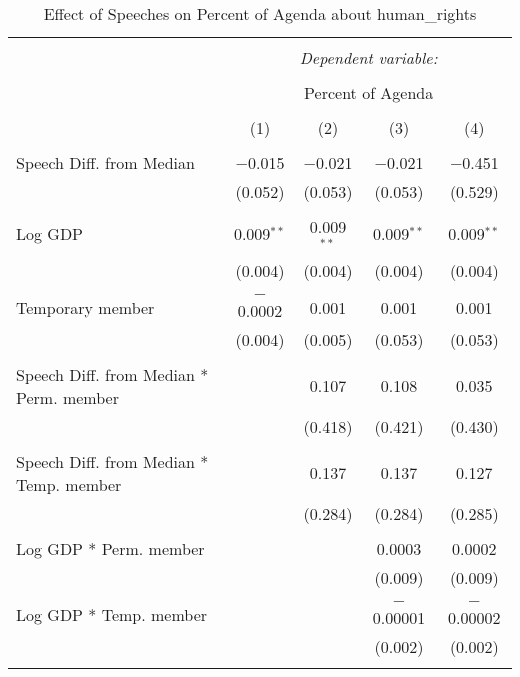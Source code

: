 
\begin{table}[!htbp] \centering 
  \caption{Effect of Speeches on Percent of Agenda about human_rights} 
  \label{} 
\begin{tabular}{@{\extracolsep{5pt}}lcccc} 
\\[-1.8ex]\hline 
\hline \\[-1.8ex] 
 & \multicolumn{4}{c}{\textit{Dependent variable:}} \\ 
\cline{2-5} 
\\[-1.8ex] & \multicolumn{4}{c}{Percent of Agenda} \\ 
\\[-1.8ex] & (1) & (2) & (3) & (4)\\ 
\hline \\[-1.8ex] 
 Speech Diff. from Median & $-$0.015 & $-$0.021 & $-$0.021 & $-$0.451 \\ 
  & (0.052) & (0.053) & (0.053) & (0.529) \\ 
  & & & & \\ 
 Log GDP & 0.009$^{**}$ & 0.009$^{**}$ & 0.009$^{**}$ & 0.009$^{**}$ \\ 
  & (0.004) & (0.004) & (0.004) & (0.004) \\ 
  & & & & \\ 
 Temporary member & $-$0.0002 & 0.001 & 0.001 & 0.001 \\ 
  & (0.004) & (0.005) & (0.053) & (0.053) \\ 
  & & & & \\ 
 Speech Diff. from Median * Perm. member &  & 0.107 & 0.108 & 0.035 \\ 
  &  & (0.418) & (0.421) & (0.430) \\ 
  & & & & \\ 
 Speech Diff. from Median * Temp. member &  & 0.137 & 0.137 & 0.127 \\ 
  &  & (0.284) & (0.284) & (0.285) \\ 
  & & & & \\ 
 Log GDP * Perm. member &  &  & 0.0003 & 0.0002 \\ 
  &  &  & (0.009) & (0.009) \\ 
  & & & & \\ 
 Log GDP * Temp. member &  &  & $-$0.00001 & $-$0.00002 \\ 
  &  &  & (0.002) & (0.002) \\ 
  & & & & \\ 

\end{tabular}
\end{table}
